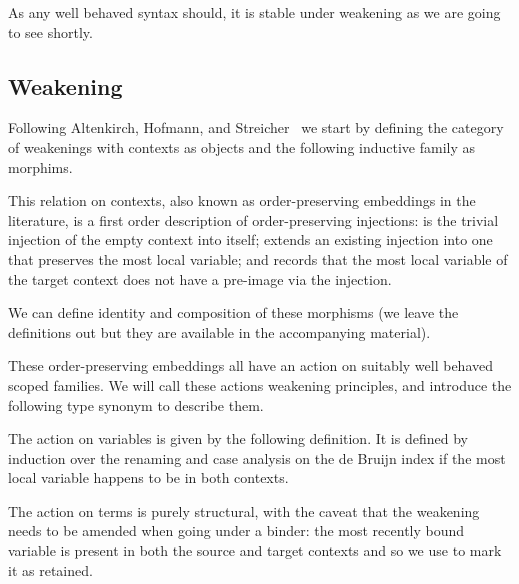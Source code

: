 
As any well behaved syntax should,
it is stable under weakening as we are going to see shortly.

\subsection{Weakening}

Following Altenkirch, Hofmann, and Streicher~\cite{DBLP:conf/ctcs/AltenkirchHS95}
we start by defining the category of weakenings with contexts
as objects and the following inductive family as morphims.


This relation on contexts, also known as order-preserving embeddings in the
literature, is a first order description of order-preserving
injections:
 is the trivial injection of the empty context into
itself;
 extends an existing injection into one that preserves
the most local variable;
and  records that the most local variable of the target
context does not have a pre-image via the injection.

We can define identity and composition of these morphisms (we leave
the definitions out but they are available in the accompanying material).

\noindent
\begin{minipage}{.15\textwidth}
\end{minipage}\hfill
\begin{minipage}{.27\textwidth}
\end{minipage}

These order-preserving embeddings all have an action on suitably
well behaved scoped families. We will call these actions weakening
principles, and introduce the following type synonym to describe them.


The action on variables is given
by the following  definition. It is defined by
induction over the renaming and case analysis on the de Bruijn
index if the most local variable happens to be in both contexts.


The action on terms is purely structural, with the caveat that
the weakening needs to be amended when going under a binder: the
most recently bound variable is present in both the source and
target contexts and so we use  to mark it as retained.

